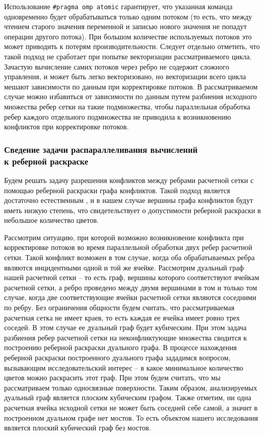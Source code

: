 Использование \texttt{\#pragma omp atomic} гарантирует, что указанная команда одновременно будет обрабатываться только одним потоком (то есть, что между чтением старого значения переменной и записью нового значения не попадут операции другого потока).
При большом количестве используемых потоков это может приводить к потерям производительности.
Следует отдельно отметить, что такой подход не сработает при попытке векторизации\label{term:vectorization} рассматриваемого цикла.
Зачастую вычисление самих потоков через ребро не содержит сложного управления, и может быть легко векторизовано, но векторизации всего цикла мешают зависимости по данным при корректировке потоков.
В рассматриваемом случае можно избавиться от зависимости по данным путем разбиения исходного множества ребер сетки на такие подмножества, чтобы параллельная обработка ребер каждого отдельного подмножества не приводила к возникновению конфликтов при корректировке потоков.

\subsubsection{Сведение задачи распараллеливания вычислений \\ к реберной раскраске}

Будем решать задачу разрешения конфликтов между ребрами расчетной сетки с помощью реберной раскраски графа конфликтов.
Такой подход является достаточно естественным \cite{Gilfanov2021Coloring}, и в нашем случае вершины графа конфликтов будут иметь низкую степень, что свидетельствует о допустимости реберной раскраски в небольшое количество цветов.

Рассмотрим ситуацию, при которой возможно возникновение конфликта при корректировке потоков во время параллельной обработки двух ребер расчетной сетки.
Такой конфликт возможен в том случае, когда оба обрабатываемых ребра являются инцидентными одной и той же ячейке.
Рассмотрим дуальный граф\label{term:dual_graph3} нашей расчетной сетки -- то есть граф, вершины которого соответствуют ячейкам расчетной сетки, а ребро проведено между двумя вершинами в том и только том случае, когда две соответствующие ячейки расчетной сетки являются соседними по ребру.
Без ограничения общности будем считать, что рассматриваемая расчетная сетка не имеет краев, то есть каждая ее ячейка имеет ровно трех соседей.
В этом случае ее дуальный граф будет кубическим.
При этом задача разбиения ребер расчетной сетки на неконфликтующие множества сводится к построению реберной раскраски дуального графа.
В процессе нахождения реберной раскраски построенного дуального графа зададимся вопросом, вызывающим  исследовательский интерес -- в какое минимальное количество цветов можно раскрасить этот граф.
При этом будем считать, что мы рассматриваем только односвязные поверхности.
Таким образом, анализируемых дуальный граф является плоским кубическим графом.
Также отметим, ни одна расчетная ячейка исходной сетки не может быть соседней себе самой, а значит в построенном дуальном графе нет мостов.
То есть объектом нашего исследования является плоский кубический граф без мостов.


